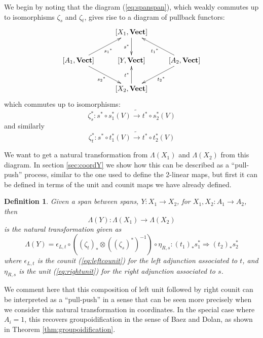 \documentclass[10pt]{amsart}
\numberwithin{theorem}{subsection}
\newtheorem{definition}[theorem]{Definition}
\newcommand{\ra}{\mathop{\rightarrow}}
\newcommand{\opname}[1]{\operatorname{#1}}
\newcommand{\catname}[1]{\boldsymbol{\opname{{#1}}}}
\newcommand{\V}{\catname{Vect}}
\newcommand{\HV}[1]{[#1,\V]}
\newcommand{\FV}{\Lambda}
\begin{document}
We begin by noting that the diagram (\ref{eq:spanspan}), which weakly
commutes up to isomorphisms $\zeta_s$ and $\zeta_t$, gives rise to a
diagram of pullback functors: 
\begin{equation}\label{eq:spanspanpullback}
\xymatrix{
 & \HV{X_1} \ar[d]_{s^{\ast}} & \\
\HV{A_1} \ar[dr]_{{s_2}^{\ast}} \ar[ur]_{{s_1}^{\ast}} & \HV{Y} & \HV{A_2} \ar[ul]^{{t_1}^{\ast}} \ar[dl]^{{t_2}^{\ast}} \\
 & \HV{X_2} \ar[u]^{t^{\ast}} & \\
}
\end{equation}
which commutes up to isomorphisms:
\begin{equation}
\zeta_s^{\ast} : s^{\ast} \circ s_1^{\ast}(V) \tilde{\ra} t^{\ast} \circ s_2^{\ast}(V)
\end{equation}
and similarly 
\begin{equation}
\zeta_t^{\ast} : s^{\ast} \circ t_1^{\ast}(V) \tilde{\ra} t^{\ast} \circ t_2^{\ast}(V)
\end{equation}

We want to get a natural transformation from $\FV(X_1)$ and $\FV(X_2)$
from this diagram.  In section \ref{sec:coordY} we show how this can
be described as a ``pull-push'' process, similar to the one used to
define the 2-linear maps, but first it can be defined in terms of the
unit and counit maps we have already defined.

\begin{definition}\label{def:Von2Span}Given a span between spans,
$Y : X_1 \ra X_2$, for $X_1,X_2 : A_1 \ra A_2$, then
\begin{equation}
\FV(Y) : \FV(X_1) \ra \FV(X_2)
\end{equation} is the natural transformation given as
\begin{equation}
\FV(Y) = \epsilon_{L,t} \circ ((\zeta_t)_{\ast} \otimes ((\zeta_s)^{\ast})^{-1} ) \circ \eta_{R,s} : (t_1)_{\ast} s_1^{\ast} \Longrightarrow (t_2)_{\ast} s_2^{\ast}
\end{equation}
where $\epsilon_{L,t}$ is the counit (\ref{eq:leftcounit}) for the
left adjunction associated to $t$, and $\eta_{R,s}$ is the unit
(\ref{eq:rightunit}) for the right adjunction associated to $s$.
\end{definition}

We comment here that this composition of left unit followed by right
counit can be interpreted as a ``pull-push'' in a sense that can be
seen more precisely when we consider this natural transformation in
coordinates.  In the special case where $A_i = 1$, this recovers
groupoidification in the sense of Baez and Dolan, as shown in Theorem
\ref{thm:groupoidification}.
\end{document}
